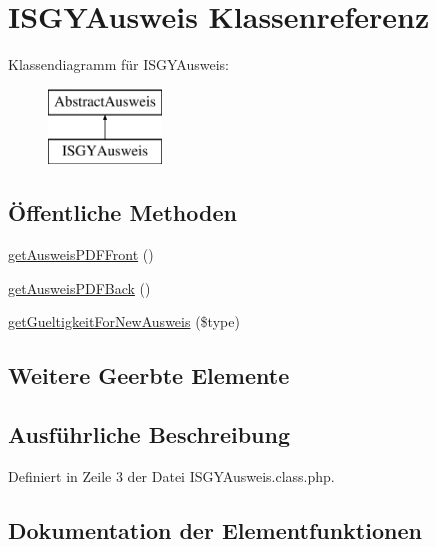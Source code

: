 \hypertarget{class_i_s_g_y_ausweis}{}\section{I\+S\+G\+Y\+Ausweis Klassenreferenz}
\label{class_i_s_g_y_ausweis}
Klassendiagramm für I\+S\+G\+Y\+Ausweis\+:\begin{figure}[H]
\begin{center}
\leavevmode
\includegraphics[height=2.000000cm]{class_i_s_g_y_ausweis}
\end{center}
\end{figure}
\subsection*{Öffentliche Methoden}
\begin{DoxyCompactItemize}
\item 
\mbox{\hyperlink{class_i_s_g_y_ausweis_a4f56590788332c4c0d96f4ff623992e3}{get\+Ausweis\+P\+D\+F\+Front}} ()
\item 
\mbox{\hyperlink{class_i_s_g_y_ausweis_ab227c4e39cccb38342817fa2e1ffa95b}{get\+Ausweis\+P\+D\+F\+Back}} ()
\item 
\mbox{\hyperlink{class_i_s_g_y_ausweis_a0fae384f710baf7cb0789b8c91f6ebde}{get\+Gueltigkeit\+For\+New\+Ausweis}} (\$type)
\end{DoxyCompactItemize}
\subsection*{Weitere Geerbte Elemente}


\subsection{Ausführliche Beschreibung}


Definiert in Zeile 3 der Datei I\+S\+G\+Y\+Ausweis.\+class.\+php.



\subsection{Dokumentation der Elementfunktionen}
\mbox{\label{class_i_s_g_y_ausweis_ab227c4e39cccb38342817fa2e1ffa95b}} 
